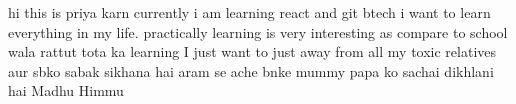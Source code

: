 hi this is priya karn
currently i am learning react and git
btech 
i want to learn everything in my life. practically learning is very interesting as compare to school wala rattut tota ka learning
I just want to just away from all my toxic relatives aur sbko sabak sikhana hai aram se ache bnke mummy papa ko sachai dikhlani hai
Madhu 
Himmu
